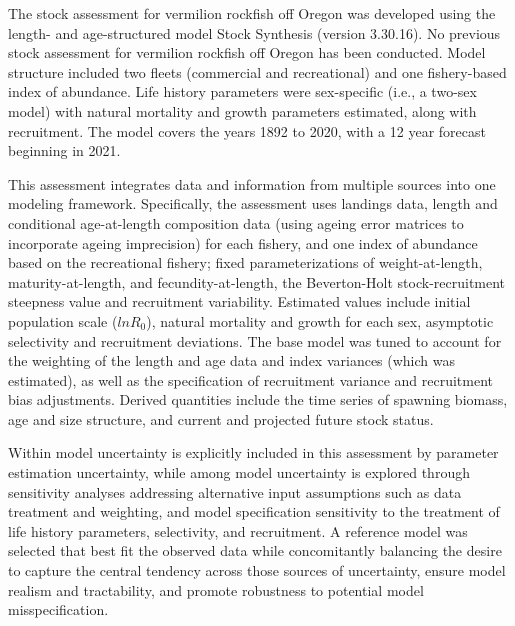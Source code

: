 \documentclass[11pt,
  english,
  a4paper,
]{article}
\begin{document}

The stock assessment for vermilion rockfish off Oregon was developed using the length- and age-structured model Stock Synthesis (version 3.30.16). No previous stock assessment for vermilion rockfish off Oregon has been conducted. Model structure included two fleets (commercial and recreational) and one fishery-based index of abundance. Life history parameters were sex-specific (i.e., a two-sex model) with natural mortality and growth parameters estimated, along with recruitment. The model covers the years 1892 to 2020, with a 12 year forecast beginning in 2021.

\leavevmode\tagmcend\tagstructend\par


This assessment integrates data and information from multiple sources into one modeling framework. Specifically, the assessment uses landings data, length and conditional age-at-length composition data (using ageing error matrices to incorporate ageing imprecision) for each fishery, and one index of abundance based on the recreational fishery; fixed parameterizations of weight-at-length, maturity-at-length, and fecundity-at-length, the Beverton-Holt stock-recruitment steepness value and recruitment variability. Estimated values include initial population scale ({\(lnR_0\)\leavevmode\tagmcend\tagstructend}), natural mortality and growth for each sex, asymptotic selectivity and recruitment deviations. The base model was tuned to account for the weighting of the length and age data and index variances (which was estimated), as well as the specification of recruitment variance and recruitment bias adjustments. Derived quantities include the time series of spawning biomass, age and size structure, and current and projected future stock status.

\leavevmode\tagmcend\tagstructend\par


Within model uncertainty is explicitly included in this assessment by parameter estimation uncertainty, while among model uncertainty is explored through sensitivity analyses addressing alternative input assumptions such as data treatment and weighting, and model specification sensitivity to the treatment of life history parameters, selectivity, and recruitment. A reference model was selected that best fit the observed data while concomitantly balancing the desire to capture the central tendency across those sources of uncertainty, ensure model realism and tractability, and promote robustness to potential model misspecification.
\end{document}
